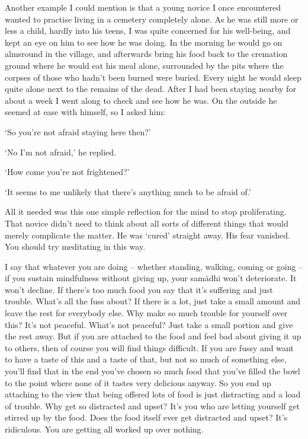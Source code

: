 Another example I could mention is that a young novice I once en\-coun\-tered wanted to practise living in a cemetery completely alone. As he was still more or less a child, hardly into his teens, I was quite concerned for his well-being, and kept an eye on him to see how he was doing. In the morning he would go on almsround in the village, and afterwards bring his food back to the cremation ground where he would eat his meal alone, surrounded by the pits where the corpses of those who hadn't been burned were buried. Every night he would sleep quite alone next to the remains of the dead. After I had been staying nearby for about a week I went along to check and see how he was. On the outside he seemed at ease with himself, so I asked him:

`So you're not afraid staying here then?'

`No I'm not afraid,' he replied.

`How come you're not frightened?'

`It seems to me unlikely that there's anything much to be afraid of.'

All it needed was this one simple reflection for the mind to stop proliferating. That novice didn't need to think about all sorts of different things that would merely complicate the matter. He was `cured' straight away. His fear vanished. You should try meditating in this way.

I say that whatever you are doing -- whether standing, walking, coming or going -- if you sustain mindfulness without giving up, your sam\=adhi won't deteriorate. It won't decline. If there's too much food you say that it's suffering and just trouble. What's all the fuss about? If there is a lot, just take a small amount and leave the rest for everybody else. Why make so much trouble for yourself over this? It's not peaceful. What's not peaceful? Just take a small portion and give the rest away. But if you are attached to the food and feel bad about giving it up to others, then of course you will find things difficult. If you are fussy and want to have a taste of this and a taste of that, but not so much of something else, you'll find that in the end you've chosen so much food that you've filled the bowl to the point where none of it tastes very delicious anyway. So you end up attaching to the view that being offered lots of food is just distracting and a load of trouble. Why get so distracted and upset? It's you who are letting yourself get stirred up by the food. Does the food itself ever get distracted and upset? It's ridiculous. You are getting all worked up over nothing.

